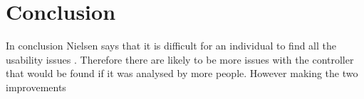 \documentclass{scrartcl}
\begin{document}
\section{Conclusion}
In conclusion Nielsen says that it is difficult for an individual to find all the usability issues  \cite{HeuristicEvaluation}. Therefore there are likely to be more issues with the controller that would be found if it was analysed by more people. However making the two improvements  



	
\end{document}
